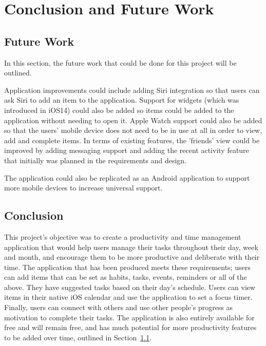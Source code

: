 \chapter{Conclusion and Future Work}
    \label{chap:conclusion}

    \section{Future Work}
    \label{sec:conclusion_future_work}
        In this section, the future work that could be done for this project will be outlined.  
    
        Application improvements could include adding Siri integration so that users can ask Siri to add an item to the application.  Support for widgets (which was introduced in iOS14) could also be added so items could be added to the application without needing to open it.  Apple Watch support could also be added so that the users' mobile device does not need to be in use at all in order to view, add and complete items.  In terms of existing features, the 'friends' view could be improved by adding messaging support and adding the recent activity feature that initially was planned in the requirements and design.
    
        The application could also be replicated as an Android application to support more mobile devices to increase universal support.
    
    \section{Conclusion}
    \label{sec:conclusion_conclusion}
        This project's objective was to create a productivity and time management application that would help users manage their tasks throughout their day, week and month, and encourage them to be more productive and deliberate with their time.  The application that has been produced meets these requirements; users can add items that can be set as habits, tasks, events, reminders or all of the above.  They have suggested tasks based on their day's schedule.  Users can view items in their native iOS calendar and use the application to set a focus timer.  Finally, users can connect with others and use other people's progress as motivation to complete their tasks.  The application is also entirely available for free and will remain free, and has much potential for more productivity features to be added over time, outlined in Section~\ref{sec:conclusion_future_work}.